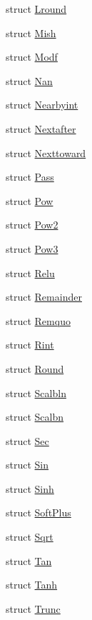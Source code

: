 \begin{DoxyCompactItemize}
\item 
struct \hyperlink{structbc_1_1oper_1_1cmath__functions_1_1Lround}{Lround}
\item 
struct \hyperlink{structbc_1_1oper_1_1cmath__functions_1_1Mish}{Mish}
\item 
struct \hyperlink{structbc_1_1oper_1_1cmath__functions_1_1Modf}{Modf}
\item 
struct \hyperlink{structbc_1_1oper_1_1cmath__functions_1_1Nan}{Nan}
\item 
struct \hyperlink{structbc_1_1oper_1_1cmath__functions_1_1Nearbyint}{Nearbyint}
\item 
struct \hyperlink{structbc_1_1oper_1_1cmath__functions_1_1Nextafter}{Nextafter}
\item 
struct \hyperlink{structbc_1_1oper_1_1cmath__functions_1_1Nexttoward}{Nexttoward}
\item 
struct \hyperlink{structbc_1_1oper_1_1cmath__functions_1_1Pass}{Pass}
\item 
struct \hyperlink{structbc_1_1oper_1_1cmath__functions_1_1Pow}{Pow}
\item 
struct \hyperlink{structbc_1_1oper_1_1cmath__functions_1_1Pow2}{Pow2}
\item 
struct \hyperlink{structbc_1_1oper_1_1cmath__functions_1_1Pow3}{Pow3}
\item 
struct \hyperlink{structbc_1_1oper_1_1cmath__functions_1_1Relu}{Relu}
\item 
struct \hyperlink{structbc_1_1oper_1_1cmath__functions_1_1Remainder}{Remainder}
\item 
struct \hyperlink{structbc_1_1oper_1_1cmath__functions_1_1Remquo}{Remquo}
\item 
struct \hyperlink{structbc_1_1oper_1_1cmath__functions_1_1Rint}{Rint}
\item 
struct \hyperlink{structbc_1_1oper_1_1cmath__functions_1_1Round}{Round}
\item 
struct \hyperlink{structbc_1_1oper_1_1cmath__functions_1_1Scalbln}{Scalbln}
\item 
struct \hyperlink{structbc_1_1oper_1_1cmath__functions_1_1Scalbn}{Scalbn}
\item 
struct \hyperlink{structbc_1_1oper_1_1cmath__functions_1_1Sec}{Sec}
\item 
struct \hyperlink{structbc_1_1oper_1_1cmath__functions_1_1Sin}{Sin}
\item 
struct \hyperlink{structbc_1_1oper_1_1cmath__functions_1_1Sinh}{Sinh}
\item 
struct \hyperlink{structbc_1_1oper_1_1cmath__functions_1_1SoftPlus}{Soft\+Plus}
\item 
struct \hyperlink{structbc_1_1oper_1_1cmath__functions_1_1Sqrt}{Sqrt}
\item 
struct \hyperlink{structbc_1_1oper_1_1cmath__functions_1_1Tan}{Tan}
\item 
struct \hyperlink{structbc_1_1oper_1_1cmath__functions_1_1Tanh}{Tanh}
\item 
struct \hyperlink{structbc_1_1oper_1_1cmath__functions_1_1Trunc}{Trunc}
\end{DoxyCompactItemize}
